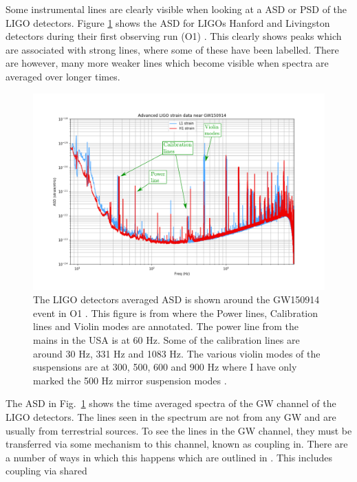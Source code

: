 Some instrumental lines are clearly visible when looking at a \gls{ASD} or
\gls{PSD} of the \gls{LIGO} detectors. Figure \ref{detchar:line:psd} shows the
\gls{ASD} for \glspl{LIGO} Hanford and Livingston detectors during their first
observing run (O1) \citep{GWOpen}. This clearly shows peaks which are
associated with strong lines, where some of these have been labelled. There are however, many
more weaker lines which become visible when spectra are averaged over longer
times.
%
\begin{figure} \centering
\includegraphics[width=\textwidth]{C5_detchar/ligo_o1_asd_annot.pdf}
\caption[Strain \gls{ASD} for the \gls{LIGO} detectors.]{
	The \gls{LIGO} detectors averaged \gls{ASD} is shown around the GW150914 event in O1 \citep{abbott2016ObservationGravitational}.
	This figure is from \citep{GWOpen} where the Power lines, Calibration lines and Violin modes are annotated. The
	power line from the mains in the USA is at 60 Hz. Some of the calibration lines
	are around 30 Hz, 331 Hz and 1083 Hz. The various violin modes of the suspensions are at 300, 500, 600 and 900 Hz where I have only marked the 500 Hz mirror suspension modes \citep{GWOpen}.} 
	\label{detchar:line:psd} 
\end{figure}
%
The \gls{ASD} in Fig.~\ref{detchar:line:psd} shows the time averaged spectra
of the \gls{GW} channel of the \gls{LIGO} detectors. The lines seen in the spectrum are not from any \gls{GW}
and are usually from terrestrial sources.  To see the lines in the \gls{GW}
channel, they must be transferred via some mechanism to this channel, known as coupling in.  There are a number of
ways in which this happens which are outlined in
\citep{covas2018IdentificationMitigation}.  This includes coupling via shared
